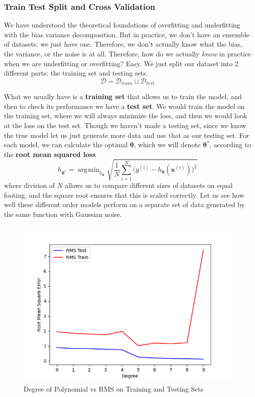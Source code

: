 \documentclass{article}
\DeclareMathOperator*{\argmin}{\arg\!\min}
\theoremstyle{definition}
\theoremstyle{remark}
\theoremstyle{definition}
\begin{document}
\subsubsection{Train Test Split and Cross Validation}

We have understood the theoretical foundations of overfitting and underfitting with the bias variance decomposition. But in practice, we don't have an ensemble of datasets; we just have one. Therefore, we don't actually know what the bias, the variance, or the noise is at all. Therefore, how do we actually \textit{know} in practice when we are underfitting or overfitting? Easy. We just split our dataset into 2 different parts: the training set and testing sets. 
\[\mathcal{D} = \mathcal{D}_{train} \sqcup \mathcal{D}_{test}\]

What we usually have is a \textbf{training set} that allows us to train the model, and then to check its performance we have a \textbf{test set}. We would train the model on the training set, where we will always minimize the loss, and then we would look at the loss on the test set. Though we haven't made a testing set, since we know the true model let us just generate more data and use that as our testing set. For each model, we can calculate the optimal $\boldsymbol{\theta}$, which we will denote $\boldsymbol{\theta}^\ast$, according to the \textbf{root mean squared loss}
\[h_{\boldsymbol{\theta}^\ast} = \argmin_{h_{\boldsymbol{\theta}}} \sqrt{ \frac{1}{N} \sum_{i=1}^N \big( y^{(i)} - h_{\boldsymbol{\theta}} (\mathbf{x}^{(i)}) \big)^2 }\]
where division of $N$ allows us to compare different sizes of datasets on equal footing, and the square root ensures that this is scaled correctly. Let us see how well these different order models perform on a separate set of data generated by the same function with Gaussian noise. 
\begin{figure}[hbt!]
    \centering
    \includegraphics[scale=0.4]{polynomial_first/Degree_vs_RMS.png}
    \caption{Degree of Polynomial vs RMS on Training and Testing Sets}
    \label{fig:poly_deg_vs_rms}
\end{figure}
\end{document}
